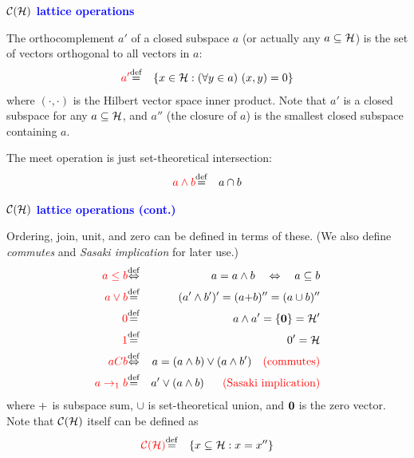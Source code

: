 \documentclass{slides}
\begin{document}
\begin{slide}

\begin{center}
\textcolor{blue}{\textbf{${\cal C}({\cal H})$ lattice operations}}
\end{center}

The orthocomplement $a'$ of a closed subspace $a$ (or actually any
$a\subseteq{\cal H}$) is the set of vectors orthogonal
to all vectors in $a$:
\begin{eqnarray}
\textcolor{red}{a'} &
{\buildrel\rm def\over =}& \{x \in {\cal H} : (\forall y \in a)\ (x,y) = 0\}
\end{eqnarray}
where $(\cdot,\cdot)$ is the Hilbert vector space inner product.
Note that $a'$ is a closed subspace for any $a\subseteq{\cal H}$,
and $a''$ (the closure of $a$) is the smallest closed subspace
containing $a$.

The meet operation is
just set-theoretical intersection:
\begin{eqnarray}
\textcolor{red}{a\wedge b} &
{\buildrel\rm def\over =}& a\cap b
\end{eqnarray}

\end{slide}
\begin{slide}

\begin{center}
\textcolor{blue}{\textbf{${\cal C}({\cal H})$ lattice operations (cont.)}}
\end{center}

Ordering, join, unit, and zero can be defined in terms of these.  (We
also define {\em commutes} and {\em Sasaki implication} for later use.)
\begin{eqnarray}
  \textcolor{red}{a\le b} & {\buildrel\rm def\over \Leftrightarrow}&
    a=a\wedge b \quad\Leftrightarrow\quad a\subseteq b
\\
  \textcolor{red}{a\vee b} &
  {\buildrel\rm def\over =}& (a'\wedge b')' = (a{\bf +}b)''= (a\cup b)''
\\
  \textcolor{red}{0} &
  {\buildrel\rm def\over =}& a \wedge a' = \{ {\bf 0} \} = {\cal H}'
\\
  \textcolor{red}{1} &
  {\buildrel\rm def\over =}& 0' ={\cal H}
\\
  \textcolor{red}{aCb} & {\buildrel\rm def\over \Leftrightarrow}&
  a=(a\wedge b)\vee (a\wedge b') \quad\textcolor{red}{\mbox{(commutes)}}
\\
  \textcolor{red}{a\to_1b} &
  {\buildrel\rm def\over =}& a'\vee(a\wedge b)
  \ \ \quad\textcolor{red}{\mbox{(Sasaki implication)}}
\end{eqnarray}
where ${\bf +}$ is subspace sum, $\cup$ is set-theoretical union, and ${\bf 0}$ is the
zero vector.  Note that
${\cal C}({\cal H})$ itself can be defined as
\begin{eqnarray}
\textcolor{red}{{\cal C}({\cal H})}  &
{\buildrel\rm def\over =}&\{x \subseteq {\cal H} : x=x''\}
\end{eqnarray}

\end{slide}
\end{document}
